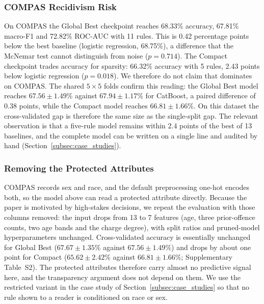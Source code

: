 

\subsubsection{COMPAS Recidivism Risk}
On COMPAS the Global Best checkpoint reaches 68.33\% accuracy, 67.81\% macro-F1
and 72.82\% ROC-AUC with 11 rules. This is 0.42 percentage points below the best
baseline (logistic regression, 68.75\%), a difference that the McNemar test
cannot distinguish from noise ($p = 0.714$). The Compact checkpoint trades
accuracy for sparsity: 66.32\% accuracy with 5 rules, 2.43 points below logistic
regression ($p = 0.018$). We therefore do not claim that \modelname{} dominates
on COMPAS. The shared $5\times5$ folds confirm this reading: the Global Best
model reaches $67.56 \pm 1.49\%$ against $67.94 \pm 1.17\%$ for CatBoost, a
paired difference of 0.38 points, while the Compact model reaches
$66.81 \pm 1.66\%$. On this dataset the cross-validated gap is therefore the
same size as the single-split gap. The relevant observation is that a five-rule
model remains within 2.4 points of the best of 13 baselines, and the complete
model can be written on a single line and audited by hand
(Section~\ref{subsec:case_studies}).

\subsubsection{Removing the Protected Attributes}
COMPAS records sex and race, and the default preprocessing one-hot encodes both,
so the model above can read a protected attribute directly. Because the paper is
motivated by high-stakes decisions, we repeat the evaluation with those columns
removed: the input drops from 13 to 7 features (age, three prior-offence counts,
two age bands and the charge degree), with split ratios and pruned-model
hyperparameters unchanged. Cross-validated accuracy is essentially unchanged for
Global Best ($67.67 \pm 1.35\%$ against $67.56 \pm 1.49\%$) and drops by about one
point for Compact ($65.62 \pm 2.42\%$ against $66.81 \pm 1.66\%$;
Supplementary Table~S2). The protected attributes therefore carry almost no
predictive signal here, and the transparency argument does not depend on them. We
use the restricted variant in the case study of Section~\ref{subsec:case_studies}
so that no rule shown to a reader is conditioned on race or sex.


